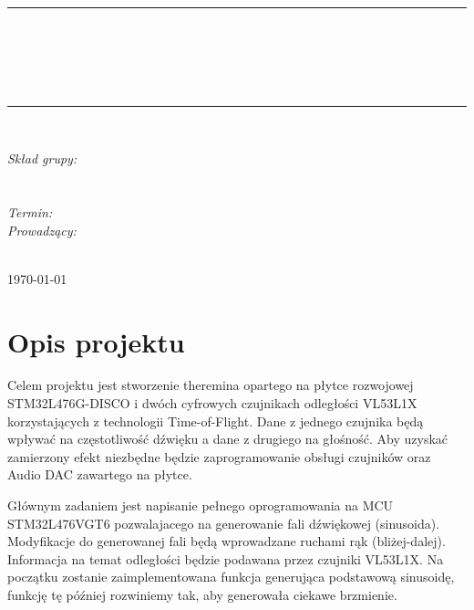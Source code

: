 \documentclass[10pt, a4paper]{article}
\begin{document}
\def\tablename{Tabela}	%

\begin{titlepage}
	\begin{center}
		\textsc{\LARGE \formakursu}\\[1cm]		
		\textsc{\Large \kurs}\\[0.5cm]		
		\rule{\textwidth}{0.08cm}\\[0.4cm]
		{\huge \bfseries \doctype}\\[1cm]
		{\huge \bfseries \projectname}\\[0.5cm]
		{\huge \bfseries \acronim}\\[0.4cm]
		\rule{\textwidth}{0.08cm}\\[1cm]
		
		\begin{flushright} \large
		\emph{Skład grupy:}\\
		\osobaA\\
		\osobaB\\[0.4cm]
		
		\emph{Termin: }\termin\\[0.4cm]

		\emph{Prowadzący:} \\
		\prowadzacy \\
		
		\end{flushright}
		
		\vfill
		
		{\large \today}
	\end{center}	
\end{titlepage}

\newpage
\tableofcontents
\newpage

\section{Opis projektu}
\label{sec:OpisProjektu}

Celem projektu jest stworzenie theremina opartego na płytce rozwojowej STM32L476G-DISCO\cite{DevBoard} i dwóch cyfrowych czujnikach odległości VL53L1X\cite{VL53L1X} korzystających z technologii Time-of-Flight. Dane z jednego czujnika będą wpływać na częstotliwość dźwięku a dane z drugiego na głośność. Aby uzyskać zamierzony efekt niezbędne będzie zaprogramowanie obsługi czujników oraz Audio DAC\cite{CS43L22} zawartego na płytce. 

Głównym zadaniem jest napisanie pełnego oprogramowania na MCU STM32L476VGT6\cite{MCU} pozwalajacego na generowanie fali dźwiękowej (sinusoida). Modyfikacje do generowanej fali będą wprowadzane ruchami rąk (bliżej-dalej). Informacja na temat odległości będzie podawana przez czujniki VL53L1X. Na początku zostanie zaimplementowana funkcja generująca podstawową sinusoidę, funkcję tę później rozwiniemy tak, aby generowała ciekawe brzmienie.
\end{document}
